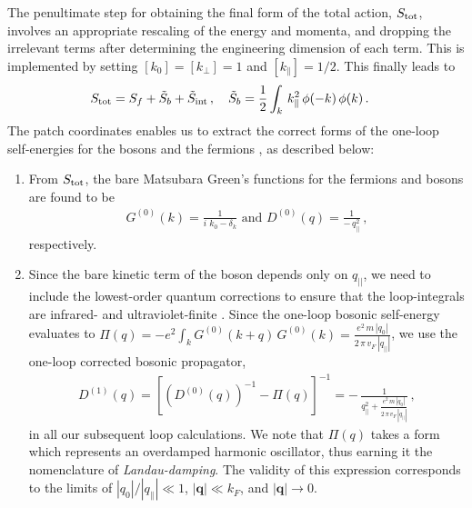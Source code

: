\documentclass[aps, prb, onecolumn, nofootinbib, citeautoscript, 10pt]{revtex4-2}
\begin{document}
The penultimate step for obtaining the final form of the total action, $S_{\rm tot}$, involves an appropriate rescaling of the energy and momenta, and dropping the irrelevant terms \cite{Lee-Dalid,ips-uv-ir1} after determining the engineering dimension of each term. This is implemented by setting $[k_0] = [k_\perp] = 1$ and $ [k_\parallel] =1/2$. This finally leads to
\begin{align}
S_{\rm tot} & = S_f  +  \tilde S_b  +  \tilde S_{\rm int} \,,\quad
\tilde S_b  = \frac{1}{2} \int_{k}\,k_{\parallel}^2 \,\phi(-k) \,\phi(k) \,.
\end{align}
The patch coordinates enables us to extract the correct forms of the one-loop self-energies for the bosons and the fermions \cite{metlsach1, Lee-Dalid, ips-uv-ir1}, as described below:
\begin{enumerate}[leftmargin=*]

\item
From $S_{\rm tot}$, the bare Matsubara Green's functions for the fermions and bosons are found to be
\begin{align}
	\label{eqbareGF}
	G^{(0)} (k)
	= \frac{1} {  i \, \, k_0 - \delta_k  } \text{ and }
	D^{(0)} (q) = \frac{1} { - \, q_{||}^2} \,,
\end{align}
respectively. 
	
\item Since the bare kinetic term of the boson depends only on $q_{||}$, we
need to include the lowest-order quantum corrections to ensure that the loop-integrals are infrared- and ultraviolet-finite \cite{Lee-Dalid,ips-uv-ir1}. Since the one-loop bosonic self-energy evaluates to
$ \Pi(q)= - e^2 \int_k G^{(0)}(k + q)
\,G^{(0)} (k)=\frac{e^2\, m \,|q_0|}
{2 \, \pi \, v_F \,|q_{||}|}$,
we use the one-loop corrected bosonic propagator,
\begin{align}
	D^{(1)}(q)=\left[
	\left(  D^{(0)} (q)\right) ^{-1} 
	-\Pi(q)   \right]^{-1}
	= - \,\frac{1} {q_{||}^2  +  \frac{e^2  \, m\, |q_0|} {2 \,\pi \,v_F \,|q_{||}|}} \,,
	\label{eqbareD}
\end{align} 
in all our subsequent loop calculations.
We note that $ \Pi(q)$ takes a form which represents an overdamped harmonic oscillator, thus earning it the nomenclature of \textit{Landau-damping}. The validity of this expression corresponds to the limits of $| q_0|/|q_\parallel| \ll 1 $, $|\mathbf q| \ll k_F$, and $ |\mathbf q| \rightarrow 0 $.



\end{enumerate}
\end{document}
